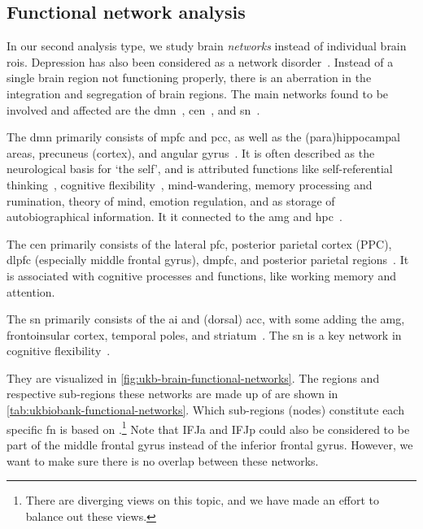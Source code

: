 \subsection{Functional network analysis}

In our second analysis type, we study brain \emph{networks} instead of individual brain \glspl{roi}.
Depression has also been considered as a network disorder~\parencite{Mulders2015}.
Instead of a single brain region not functioning properly, there is an aberration in the integration and segregation of brain regions.
The main networks found to be involved and affected are the \gls{dmn}~\parencite{Berman2011, Demirtas2016, Wise2017, Yan2019, Zhao2019, Zhou2020}, \gls{cen}~\parencite{Zhao2019}, and \gls{sn}~\parencite{Manoliu2014}.

The \gls{dmn} primarily consists of \gls{mpfc} and \gls{pcc}, as well as the (para)hippocampal areas, precuneus (cortex), and angular gyrus~\parencite{Andrews-Hanna2010}.
It is often described as the neurological basis for `the self', and is attributed functions like self-referential thinking~\parencite{Sheline2009}, cognitive flexibility~\parencite{Vatansever2016}, mind-wandering, memory processing and rumination, theory of mind, emotion regulation, and as storage of autobiographical information.
It it connected to the \gls{amg} and \gls{hpc}~\parencite{Andrews-Hanna2014}.

The \gls{cen} primarily consists of the lateral \gls{pfc}, posterior parietal cortex (PPC), \gls{dlpfc} (especially middle frontal gyrus), \gls{dmpfc}, and posterior parietal regions~\parencite{Rogers2004}.
It is associated with cognitive processes and functions, like working memory and attention.

The \gls{sn} primarily consists of the \gls{ai} and (dorsal) \gls{acc}, with some adding the \gls{amg}, frontoinsular cortex, temporal poles, and striatum~\parencite{Seeley2007, Menon2010, Beck2016}.
The \gls{sn} is a key network in cognitive flexibility~\parencite{Dajani2015}.

They are visualized in \cref{fig:ukb-brain-functional-networks}.
The regions and respective sub-regions these networks are made up of are shown in \cref{tab:ukbiobank-functional-networks}.
Which sub-regions (nodes) constitute each specific \gls{fn} is based on \textcite{Fan2016, Uddin2019, Oane2020}.\footnote{There are diverging views on this topic, and we have made an effort to balance out these views.}
Note that IFJa and IFJp could also be considered to be part of the middle frontal gyrus instead of the inferior frontal gyrus.
However, we want to make sure there is no overlap between these networks.


